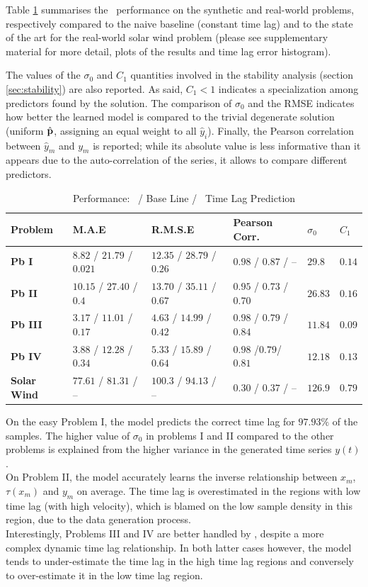 Table \ref{tab:results_syn} summarises the \XX\ performance on the synthetic and real-world 
problems, respectively compared to the naive baseline (constant time lag) and to the state of the 
art for the real-world solar wind problem (please see supplementary material for more detail, 
plots of the results and time lag error histogram). 

The values of the $\sigma_0$ and $C_1$ quantities involved in the stability analysis 
(section \ref{sec:stability}) are also reported. As said, $C_1 < 1$ indicates a specialization 
among predictors found by the solution. The comparison of $\sigma_0$ and the RMSE indicates how 
better the learned model is compared to the trivial degenerate solution (uniform $\hat {\bf p}$, 
assigning an equal weight to all $\hat y_i$). Finally, the Pearson correlation between 
$\hat y_m$ and $y_m$ is reported; while its absolute value is less informative than it appears due 
to the auto-correlation of the series, it allows to compare different predictors. 

\begin{table}
  \caption{Performance: \XX  \ / Base Line / \XX  \ Time Lag Prediction}\label{tab:results_syn}
  \centering
  \begin{tabular}{ l l l l l l}
  \hline
  Problem &  M.A.E & R.M.S.E & Pearson Corr. & $\sigma_0$ & $C_1$\\
  \hline
  \textbf{Pb I} & $8.82$ / $21.79$ / $0.021$  & $12.35$ / $28.79$ / $0.26$ & $0.98$ / $0.87$ / -- & $29.8$ & $0.14$\\
  \textbf{Pb II} & $10.15$ / $27.40$ / $0.4$ & $13.70$ / $35.11$ / $0.67$ & $0.95$ / $0.73$ / $0.70$ & $26.83$ & $0.16$\\
  \textbf{Pb III} & $3.17$ / $11.01$ / $0.17$ & $4.63$ / $14.99$ / $0.42$ & $0.98$ / $0.79$ / $0.84$ & $11.84$ & $0.09$\\
  \textbf{Pb IV} & $3.88$ / $12.28$ / $0.34$ & $5.33$ / $15.89$ / $0.64$ & $0.98$ /$0.79$/ $0.81$ & $12.18$ & $0.13$\\
  \textbf{Solar Wind} & $77.61$ / $81.31$ / -- & $100.3$ / $94.13$ / -- & $0.30$ / $0.37$ / -- & $126.9$ & $0.79$\\
  \hline
  \end{tabular}
\end{table}

On the easy Problem I, the model predicts the correct time lag for $97.93\%$ of the samples. The 
higher value of $\sigma_0$ in problems I and II compared to the other problems is explained from 
the higher variance in the generated  time series $y(t)$. \\
On Problem II, the model accurately learns the inverse relationship between $x_m$, $\tau(x_m)$ and 
$y_m$ on average. The time lag is overestimated in the regions with low time lag 
(with high velocity), which is blamed on the low sample density in this region, due to the data 
generation process. \\
Interestingly, Problems III and IV are better handled by \XX, despite a more complex dynamic time 
lag relationship. In both latter cases however, the model tends to under-estimate the time lag in 
the high time lag regions and conversely to over-estimate it in the low time lag region. 

